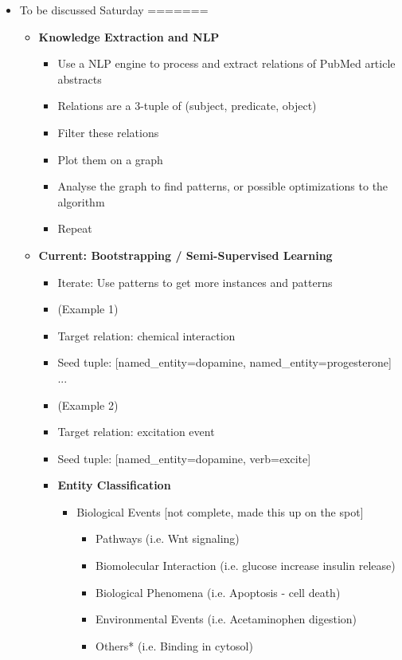 \documentclass[11pt]{article}
\begin{document}
\begin{itemize}
\begin{itemize}
\item To be discussed Saturday
=======
\begin{itemize}
\item \textbf{Knowledge Extraction and NLP}
	\begin{itemize}
	\item Use a NLP engine to process and extract relations of PubMed article abstracts
	\item Relations are a 3-tuple of (subject, predicate, object)
	\item Filter these relations
	\item Plot them on a graph
	\item Analyse the graph to find patterns, or possible optimizations to the algorithm
	\item Repeat
	\end{itemize}
\item \textbf{Current: Bootstrapping / Semi-Supervised Learning}
	\begin{itemize}
	\item Iterate: Use patterns to get more instances and patterns 
	\item (Example 1)	
	\item 		Target relation: chemical interaction
	\item 		Seed tuple: [named_entity=dopamine, named_entity=progesterone] ...
	\item (Example 2)	
	\item 		Target relation: excitation event
	\item 		Seed tuple: [named_entity=dopamine, verb=excite]	
\item \textbf{Entity Classification}
	\begin{itemize}
	\item Biological Events [not complete, made this up on the spot]
		\begin{itemize}
		\item Pathways (i.e. Wnt signaling)
		\item Biomolecular Interaction (i.e. glucose increase insulin release)
		\item Biological Phenomena (i.e. Apoptosis - cell death)
		\item Environmental Events (i.e. Acetaminophen digestion)
		\item Others* (i.e. Binding in cytosol)
		\end{itemize}
	\end{itemize}
\end{itemize}


\end{itemize}
\end{itemize}
\end{itemize}
\end{document}
